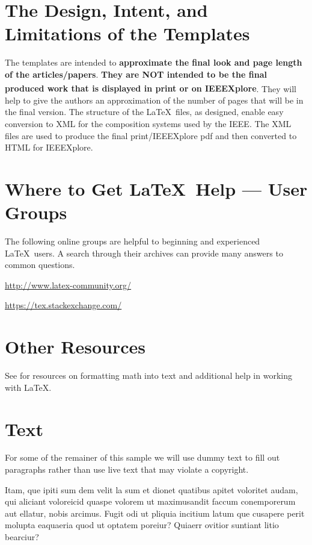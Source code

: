 
\section{The Design, Intent, and \\ Limitations of the Templates}
The templates are intended to {\bf{approximate the final look and page length of the articles/papers}}. {\bf{They are NOT intended to be the final produced work that is displayed in print or on IEEEXplore\textsuperscript{\textregistered}}}. They will help to give the authors an approximation of the number of pages that will be in the final version. The structure of the \LaTeX\ files, as designed, enable easy conversion to XML for the composition systems used by the IEEE. The XML files are used to produce the final print/IEEEXplore pdf and then converted to HTML for IEEEXplore.

\section{Where to Get \LaTeX \ Help --- User Groups}
The following online groups are helpful to beginning and experienced \LaTeX\ users. A search through their archives can provide many answers to common questions.
\begin{list}{}{}
\item{\url{http://www.latex-community.org/}} 
\item{\url{https://tex.stackexchange.com/} }
\end{list}

\section{Other Resources}
See \cite{ref1,ref2,ref3,ref4,ref5} for resources on formatting math into text and additional help in working with \LaTeX .

\section{Text}
For some of the remainer of this sample we will use dummy text to fill out paragraphs rather than use live text that may violate a copyright.

Itam, que ipiti sum dem velit la sum et dionet quatibus apitet voloritet audam, qui aliciant voloreicid quaspe volorem ut maximusandit faccum conemporerum aut ellatur, nobis arcimus.
Fugit odi ut pliquia incitium latum que cusapere perit molupta eaquaeria quod ut optatem poreiur? Quiaerr ovitior suntiant litio bearciur?

